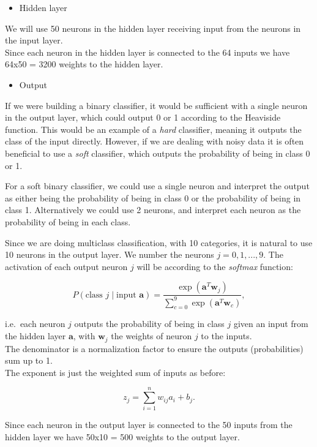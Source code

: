 \documentclass[11pt]{article}
\providecommand{\tightlist}{%
      \setlength{\itemsep}{0pt}\setlength{\parskip}{0pt}}
\begin{document}
\begin{itemize}
\tightlist
\item
  Hidden layer
\end{itemize}

We will use 50 neurons in the hidden layer receiving input from the
neurons in the input layer.\\
Since each neuron in the hidden layer is connected to the 64 inputs we
have 64x50 = 3200 weights to the hidden layer.

\begin{itemize}
\tightlist
\item
  Output
\end{itemize}

If we were building a binary classifier, it would be sufficient with a
single neuron in the output layer, which could output 0 or 1 according
to the Heaviside function. This would be an example of a \emph{hard}
classifier, meaning it outputs the class of the input directly. However,
if we are dealing with noisy data it is often beneficial to use a
\emph{soft} classifier, which outputs the probability of being in class
0 or 1.

For a soft binary classifier, we could use a single neuron and interpret
the output as either being the probability of being in class 0 or the
probability of being in class 1. Alternatively we could use 2 neurons,
and interpret each neuron as the probability of being in each class.

Since we are doing multiclass classification, with 10 categories, it is
natural to use 10 neurons in the output layer. We number the neurons
\(j = 0,1,...,9\). The activation of each output neuron \(j\) will be
according to the \emph{softmax} function:

\[ P(\text{class $j$} \mid \text{input $\boldsymbol{a}$}) = \frac{\exp{(\boldsymbol{a}^T \boldsymbol{w}_j)}}
{\sum_{c=0}^{9} \exp{(\boldsymbol{a}^T \boldsymbol{w}_c)}} ,\]

i.e.~each neuron \(j\) outputs the probability of being in class \(j\)
given an input from the hidden layer \(\boldsymbol{a}\), with
\(\boldsymbol{w}_j\) the weights of neuron \(j\) to the inputs.\\
The denominator is a normalization factor to ensure the outputs
(probabilities) sum up to 1.\\
The exponent is just the weighted sum of inputs as before:

\[ z_j = \sum_{i=1}^n w_ {ij} a_i+b_j.\]

Since each neuron in the output layer is connected to the 50 inputs from
the hidden layer we have 50x10 = 500 weights to the output layer.
\end{document}
